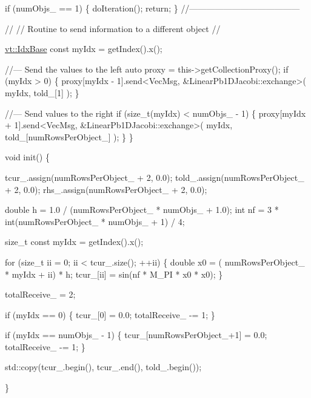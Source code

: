 \begin{DoxyCodeInclude}
    \textcolor{keywordflow}{if} (numObjs\_ == 1) \{
      doIteration();
      \textcolor{keywordflow}{return};
    \}
    \textcolor{comment}{//---------------------------------------}

    \textcolor{comment}{//}
    \textcolor{comment}{// Routine to send information to a different object}
    \textcolor{comment}{//}

    \hyperlink{namespacevt_afb96657e28fa98eb685c5e0c6b1b122e}{vt::IdxBase} \textcolor{keyword}{const} myIdx = getIndex().x();

    \textcolor{comment}{//--- Send the values to the left}
    \textcolor{keyword}{auto} proxy = this->getCollectionProxy();
    \textcolor{keywordflow}{if} (myIdx > 0) \{
      proxy[myIdx - 1].send<VecMsg, &LinearPb1DJacobi::exchange>(
        myIdx, told\_[1]
      );
    \}

    \textcolor{comment}{//--- Send values to the right}
    \textcolor{keywordflow}{if} (\textcolor{keywordtype}{size\_t}(myIdx) < numObjs\_ - 1) \{
      proxy[myIdx + 1].send<VecMsg, &LinearPb1DJacobi::exchange>(
        myIdx, told\_[numRowsPerObject\_]
      );
    \}
  \}


  \textcolor{keywordtype}{void} init() \{

    tcur\_.assign(numRowsPerObject\_ + 2, 0.0);
    told\_.assign(numRowsPerObject\_ + 2, 0.0);
    rhs\_.assign(numRowsPerObject\_ + 2, 0.0);

    \textcolor{keywordtype}{double} h = 1.0 / (numRowsPerObject\_ * numObjs\_ + 1.0);
    \textcolor{keywordtype}{int} nf = 3 * int(numRowsPerObject\_ * numObjs\_ + 1) / 4;

    \textcolor{keywordtype}{size\_t} \textcolor{keyword}{const} myIdx = getIndex().x();

    \textcolor{keywordflow}{for} (\textcolor{keywordtype}{size\_t} ii = 0; ii < tcur\_.size(); ++ii) \{
      \textcolor{keywordtype}{double} x0 = ( numRowsPerObject\_ * myIdx + ii) * h;
      tcur\_[ii] = sin(nf * M\_PI * x0 * x0);
    \}

    totalReceive\_ = 2;

    \textcolor{keywordflow}{if} (myIdx == 0) \{
      tcur\_[0] = 0.0;
      totalReceive\_ -= 1;
    \}

    \textcolor{keywordflow}{if} (myIdx == numObjs\_ - 1) \{
      tcur\_[numRowsPerObject\_+1] = 0.0;
      totalReceive\_ -= 1;
    \}

    std::copy(tcur\_.begin(), tcur\_.end(), told\_.begin());

  \}



\end{DoxyCodeInclude}
